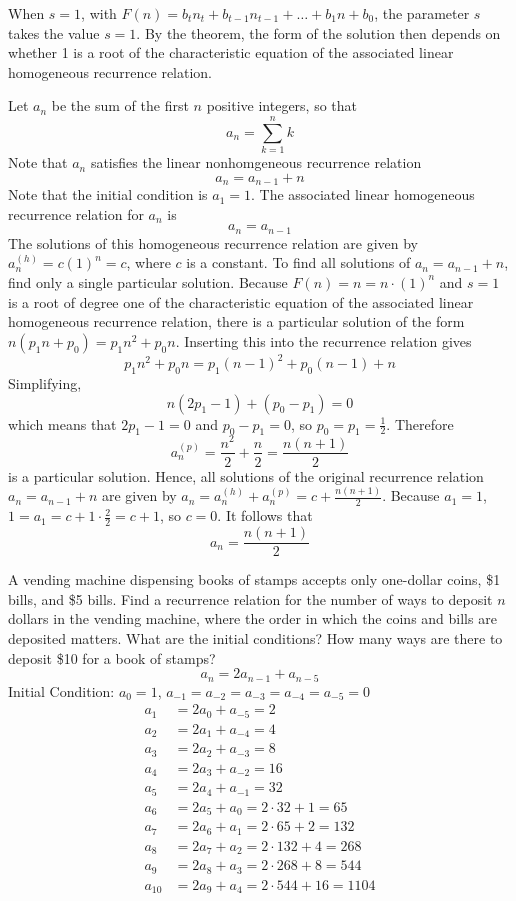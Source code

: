 \documentclass[12pt]{article}
\begin{document}
When $s = 1$, with $F(n) = b_tn_t + b_{t - 1}n_{t  - 1} + \dots + b_1n + b_0$, the parameter $s$ takes the value $s = 1$. By the theorem, the form of the solution then depends on whether 1 is a root of the characteristic equation of the associated linear homogeneous recurrence relation. 

\begin{example} Let $a_n$ be the sum of the first $n$ positive integers, so that $$a_n = \sum_{k = 1}^n k $$ Note that $a_n$ satisfies the linear nonhomgeneous recurrence relation $$a_n = a_{n - 1} + n $$ Note that the initial condition is $a_1 = 1$. The associated linear homogeneous recurrence relation for $a_n$ is $$ a_n = a_{n - 1} $$ The solutions of this homogeneous recurrence relation are given by $a_n^{(h)} = c(1)^n = c$, where $c$ is a constant. To find all solutions of $a_n = a_{n - 1} + n$, find only a single particular solution. Because $F(n) = n = n \cdot (1)^n$ and $s = 1$ is a root of degree one of the characteristic equation of the associated linear homogeneous recurrence relation, there is a particular solution of the form $n(p_1n + p_0) = p_1n^2 + p_0n $. Inserting this into the recurrence relation gives $$p_1n^2 + p_0n = p_1(n - 1)^2 + p_0(n - 1) + n $$ Simplifying, $$n(2p_1 - 1) + (p_0 - p_1) = 0$$ which means that $2p_1 - 1 = 0$ and $p_0 - p_1 = 0$, so $p_0 = p_1 = \frac{1}{2}$. Therefore $$a_n^{(p)} = \frac{n^2}{2} + \frac{n}{2} = \frac{n(n + 1)}{2} $$ is a particular solution. Hence, all solutions of the original recurrence relation $a_n = a_{n - 1} + n$ are given by $a_n = a_n^{(h)} + a_n^{(p)} = c + \frac{n(n + 1)}{2} $. Because $a_1 = 1$, $1 = a_1 = c + 1 \cdot \frac{2}{2} = c + 1$, so $c = 0$. It follows that $$ a_n = \frac{n(n + 1)}{2} $$ \end{example} 

\begin{example} A vending machine dispensing books of stamps accepts only one-dollar coins, \$1 bills, and \$5 bills. Find a recurrence relation for the number of ways to deposit $n$ dollars in the vending machine, where the order in which the coins and bills are deposited matters. What are the initial conditions? How many ways are there to deposit \$10 for a book of stamps?
$$ a_n = 2a_{n - 1} + a_{n - 5} $$
Initial Condition: $a_0 = 1$, $a_{-1} = a_{-2} = a_{-3} = a_{-4} = a_{-5} = 0 $ $$\begin{aligned}
a_1 &= 2a_0 + a_{-5} = 2 \\
a_2 &= 2a_1 + a_{-4}  = 4 \\
a_3 & = 2a_2  + a_{-3} = 8 \\
a_4 & = 2a_3 + a_{-2} = 16 \\
a_5 & = 2a_4 + a_{-1} = 32 \\
a_6 & = 2a_5 + a_0 = 2 \cdot 32 + 1 = 65 \\
a_7 & = 2a_6 + a_1 = 2 \cdot 65 + 2 = 132 \\
a_8 & = 2a_7 + a_2 = 2 \cdot 132 + 4 = 268 \\
a_9 & = 2a_8 + a_3 = 2 \cdot 268 + 8 = 544 \\
a_{10} &= 2a_9 + a_4 = 2 \cdot 544 + 16 = 1104 \end{aligned} $$ 
\end{example} 
\end{document}
